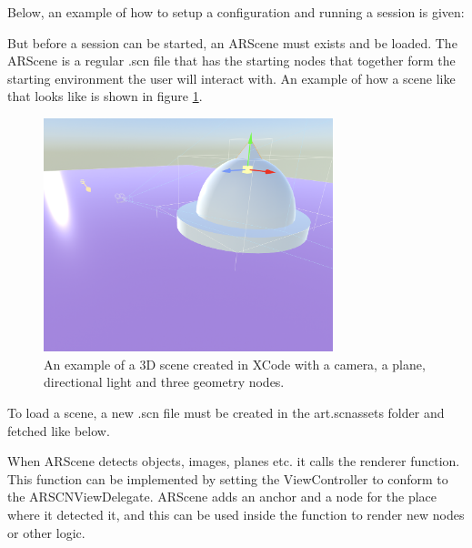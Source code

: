 Below, an example of how to setup a configuration and running a session is given:



But before a session can be started, an ARScene must exists and be loaded. The ARScene is a regular .scn file that has the starting nodes that together form the starting
environment the user will interact with. An example of how a scene like that looks like is shown in figure \ref{fig:3dsceneImage}.

\begin{figure}[hbtp]
\begin{center}
\includegraphics[width = 0.75\textwidth]{./Images/3dscene.jpg} 
\caption{An example of a 3D scene created in XCode with a camera, a plane, directional light and three geometry nodes.}
\label{fig:3dsceneImage}
\end{center}
\end{figure}

To load a scene, a new .scn file must be created in the art.scnassets folder and fetched like below.


When ARScene detects objects, images, planes etc. it calls the renderer function. This function can be implemented by setting the ViewController to conform to the ARSCNViewDelegate. ARScene adds an anchor and a node for the place where it detected it, and this can be used inside the function to render new nodes or other logic.



